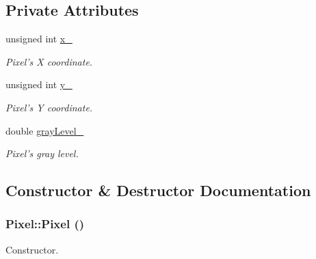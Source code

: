 \subsection*{Private Attributes}
\begin{CompactItemize}
\item 
\hypertarget{class_pixel_9f8a45ad3cbcab59543e4f7d4842ae6d}{
unsigned int \hyperlink{class_pixel_9f8a45ad3cbcab59543e4f7d4842ae6d}{x\_\-}}
\label{class_pixel_9f8a45ad3cbcab59543e4f7d4842ae6d}

\begin{CompactList}\small\item\em Pixel's X coordinate. \item\end{CompactList}\item 
\hypertarget{class_pixel_da45113dcf9ef4a0c3d5052db42da355}{
unsigned int \hyperlink{class_pixel_da45113dcf9ef4a0c3d5052db42da355}{y\_\-}}
\label{class_pixel_da45113dcf9ef4a0c3d5052db42da355}

\begin{CompactList}\small\item\em Pixel's Y coordinate. \item\end{CompactList}\item 
\hypertarget{class_pixel_545bed829ed92f39962a30ace0d7e88d}{
double \hyperlink{class_pixel_545bed829ed92f39962a30ace0d7e88d}{grayLevel\_\-}}
\label{class_pixel_545bed829ed92f39962a30ace0d7e88d}

\begin{CompactList}\small\item\em Pixel's gray level. \item\end{CompactList}\end{CompactItemize}


\subsection{Constructor \& Destructor Documentation}
\hypertarget{class_pixel_27ad99a2f705e635c42d242d530d4756}{
\subsubsection[Pixel]{\setlength{\rightskip}{0pt plus 5cm}Pixel::Pixel ()}}
\label{class_pixel_27ad99a2f705e635c42d242d530d4756}


Constructor. 

